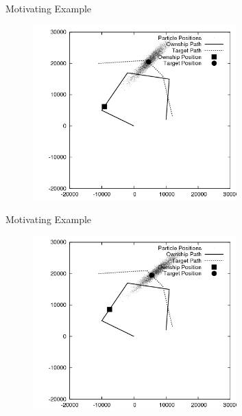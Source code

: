 \documentclass{beamer}
\begin{document}
\begin{frame}{Motivating Example}
\begin{figure}
\centering
\includegraphics[width=0.7\textwidth]{data/azimuth_only_1100.png}
\end{figure}
\end{frame}


\begin{frame}{Motivating Example}
\begin{figure}
\centering
\includegraphics[width=0.7\textwidth]{data/azimuth_only_1300.png}
\end{figure}
\end{frame}

\end{document}
